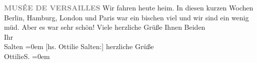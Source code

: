 \begin{ledgroupsized}[t]{13cm}
           \pstart
           \noindent{}\raggedleft{}\textcolor{gray}{\textbf{MUSÉE DE VERSAILLES}}\pend
           \pstart
           {\pb}Wir fahren heute heim. In diesen kurzen Wochen Berlin, Hamburg, London und Paris war ein bischen viel und wir sind ein wenig müd. Aber es war sehr
               schön! \label{K_L03564-1v}\label{K_L03564-1h}\pend
           \pstart
           Viele herzliche Grüße Ihnen Beiden {\\[\baselineskip]}Ihr {\\[\baselineskip]}\spacefill\mbox{Salten}\pend
           \leftskip=0em{}\pstart
           {[}hs. Ottilie Salten:{]} herzliche Grüße {\\[\baselineskip]}\spacefill\mbox{OttilieS.}\pend
           \leftskip=0em{}
         
         \endnumbering{}\end{ledgroupsized}  \newcommand{\dateiname}{L03564}\newcommand{\titel}{Felix und Ottilie Salten an Arthur und Olga Schnitzler, 25. 6. 1914}\newcommand{\editorInnen}{Martin Anton Müller und Laura Untner}
      